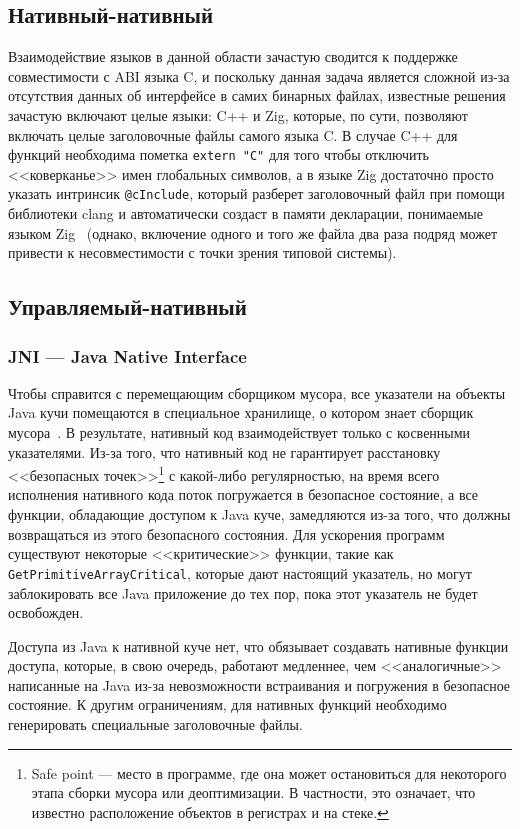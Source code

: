 \documentclass[times
,titlepage
]{itmo-student-thesis}
\begin{document}
\subsection{Нативный-нативный}
Взаимодействие языков в данной области зачастую сводится к поддержке совместимости с ABI языка C, и поскольку данная задача является сложной из-за отсутствия данных об интерфейсе в самих бинарных файлах, известные решения зачастую включают целые языки: C++ и Zig, которые, по сути, позволяют включать целые заголовочные файлы самого языка C. В случае C++ для функций необходима пометка \texttt{extern "C"} для того чтобы отключить <<коверканье>> имен глобальных символов, а в языке Zig достаточно просто указать интринсик \texttt{@cInclude}, который разберет заголовочный файл при помощи библиотеки clang и автоматически создаст в памяти декларации, понимаемые языком Zig~\cite{zig-cinclude} (однако, включение одного и того же файла два раза подряд может привести к несовместимости с точки зрения типовой системы).

\subsection{Управляемый-нативный}
\subsubsection{JNI --- Java Native Interface}
Чтобы справится с перемещающим сборщиком мусора, все указатели на объекты Java кучи помещаются в специальное хранилище, о котором знает сборщик мусора~\cite{jni-obj-references}. В результате, нативный код взаимодействует только с косвенными указателями. Из-за того, что нативный код не гарантирует расстановку <<безопасных точек>>\footnote{Safe point --- место в программе, где она может остановиться для некоторого этапа сборки мусора или деоптимизации. В частности, это означает, что известно расположение объектов в регистрах и на стеке.} с какой-либо регулярностью, на время всего исполнения нативного кода поток погружается в безопасное состояние, а все функции, обладающие доступом к Java куче, замедляются из-за того, что должны возвращаться из этого безопасного состояния. Для ускорения программ существуют некоторые <<критические>> функции, такие как \texttt{GetPrimitiveArrayCritical}, которые дают настоящий указатель, но могут заблокировать все Java приложение до тех пор, пока этот указатель не будет освобожден.

Доступа из Java к нативной куче нет, что обязывает создавать нативные функции доступа, которые, в свою очередь, работают медленнее, чем <<аналогичные>> написанные на Java из-за невозможности встраивания и погружения в безопасное состояние. К другим ограничениям, для нативных функций необходимо генерировать специальные заголовочные файлы.
\end{document}
